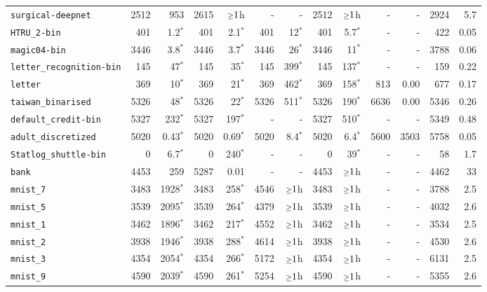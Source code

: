 \begin{tabular}{lrrrrrrrrrrrr}
\texttt{surgical-deepnet} & 2512 & 953 & 2615 & $\mathsmaller{\geq}1$h & - & - & 2512 & $\mathsmaller{\geq}1$h & - & - & 2924 & 5.7\\
\texttt{HTRU\_2-bin} & 401 & 1.2$^*$ & 401 & 2.1$^*$ & 401 & 12$^*$ & 401 & 5.7$^*$ & - & - & 422 & 0.05\\
\texttt{magic04-bin} & 3446 & 3.8$^*$ & 3446 & 3.7$^*$ & 3446 & 26$^*$ & 3446 & 11$^*$ & - & - & 3788 & 0.06\\
\texttt{letter\_recognition-bin} & 145 & 47$^*$ & 145 & 35$^*$ & 145 & 399$^*$ & 145 & 137$^*$ & - & - & 159 & 0.22\\
\texttt{letter} & 369 & 10$^*$ & 369 & 21$^*$ & 369 & 462$^*$ & 369 & 158$^*$ & 813 & 0.00 & 677 & 0.17\\
\texttt{taiwan\_binarised} & 5326 & 48$^*$ & 5326 & 22$^*$ & 5326 & 511$^*$ & 5326 & 190$^*$ & 6636 & 0.00 & 5346 & 0.26\\
\texttt{default\_credit-bin} & 5327 & 232$^*$ & 5327 & 197$^*$ & - & - & 5327 & 510$^*$ & - & - & 5349 & 0.48\\
\texttt{adult\_discretized} & 5020 & 0.43$^*$ & 5020 & 0.69$^*$ & 5020 & 8.4$^*$ & 5020 & 6.4$^*$ & 5600 & 3503 & 5758 & 0.05\\
\texttt{Statlog\_shuttle-bin} & 0 & 6.7$^*$ & 0 & 240$^*$ & - & - & 0 & 39$^*$ & - & - & 58 & 1.7\\
\texttt{bank} & 4453 & 259 & 5287 & 0.01 & - & - & 4453 & $\mathsmaller{\geq}1$h & - & - & 4462 & 33\\
\texttt{mnist\_7} & 3483 & 1928$^*$ & 3483 & 258$^*$ & 4546 & $\mathsmaller{\geq}1$h & 3483 & $\mathsmaller{\geq}1$h & - & - & 3788 & 2.5\\
\texttt{mnist\_5} & 3539 & 2095$^*$ & 3539 & 264$^*$ & 4379 & $\mathsmaller{\geq}1$h & 3539 & $\mathsmaller{\geq}1$h & - & - & 4032 & 2.6\\
\texttt{mnist\_1} & 3462 & 1896$^*$ & 3462 & 217$^*$ & 4552 & $\mathsmaller{\geq}1$h & 3462 & $\mathsmaller{\geq}1$h & - & - & 3534 & 2.5\\
\texttt{mnist\_2} & 3938 & 1946$^*$ & 3938 & 288$^*$ & 4614 & $\mathsmaller{\geq}1$h & 3938 & $\mathsmaller{\geq}1$h & - & - & 4530 & 2.6\\
\texttt{mnist\_3} & 4354 & 2054$^*$ & 4354 & 266$^*$ & 5172 & $\mathsmaller{\geq}1$h & 4354 & $\mathsmaller{\geq}1$h & - & - & 6131 & 2.5\\
\texttt{mnist\_9} & 4590 & 2039$^*$ & 4590 & 261$^*$ & 5254 & $\mathsmaller{\geq}1$h & 4590 & $\mathsmaller{\geq}1$h & - & - & 5355 & 2.6\\

\end{tabular}
